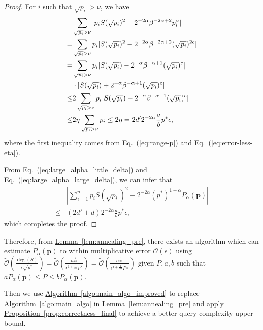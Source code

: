 \documentclass[journal]{IEEEtran}
\newcommand{\eq}[1]{Eq.~(\ref{eq:#1})}
\newcommand{\lem}[1]{\hyperref[lem:#1]{Lemma~\ref*{lem:#1}}}
\newcommand{\prop}[1]{\hyperref[prop:#1]{Proposition~\ref*{prop:#1}}}
\newcommand{\algo}[1]{\hyperref[algo:#1]{Algorithm~\ref*{algo:#1}}}
\begin{document}
\begin{proof}
  For $i$ such that $\sqrt{p_i} > \nu$, we have
  \begin{align}
      & \sum_{\sqrt{p_i} > \nu} |p_iS(\sqrt{p_i})^2-2^{-2\alpha}\beta^{-2\alpha+2}p_i^{\alpha}|
      \nonumber \\= & \sum_{\sqrt{p_i}> \nu} p_i|S(\sqrt{p_i})^2-2^{-2\alpha}\beta^{-2\alpha+2}(\sqrt{p_i})^{2c}| \notag
      \\ = & \sum_{\sqrt{p_i}> \nu} p_i|S(\sqrt{p_i})-2^{-\alpha}\beta^{-\alpha+1}(\sqrt{p_i})^{c}|\nonumber \\ &\cdot|S(\sqrt{p_i})+2^{-\alpha}\beta^{-\alpha+1}(\sqrt{p_i})^{c}| \notag
      \\ \le & 2\sum_{\sqrt{p_i}> \nu} p_i|S(\sqrt{p_i})-2^{-\alpha}\beta^{-\alpha+1}(\sqrt{p_i})^{c}| \notag
      \\ \le & 2\eta \sum_{\sqrt{p_i} > \nu} p_i \le 2\eta = 2d'2^{-2\alpha}\frac{a}{b}p^*\epsilon, \label{eq:large_alpha_large_delta}
    \end{align}
  where the first inequality comes from \eq{range-p} and \eq{error-less-eta}.



  From \eq{large_alpha_little_delta} and \eq{large_alpha_large_delta}, we can infer that
  \begin{align}
    \label{eq:large_alpha_eqn1}
    &\left|\sum_{i=1}^n p_iS(\sqrt{p_i})^2 -2^{-2\alpha}(p^*)^{1-\alpha}P_{\alpha}(\mathbf{p})\right| \nonumber \\ \le & (2d'+d)2^{-2\alpha}\frac{a}{b}p^*\epsilon,
  \end{align}
  which completes the proof.
\end{proof}

Therefore, from \lem{annealing_pre}, there exists an algorithm which can estimate $P_{\alpha}(\mathbf{p})$ to within multiplicative error $\mathcal{O}(\epsilon)$ using $\widetilde{\mathcal{O}}\left(\frac{\deg(S)}{\epsilon \sqrt{p^*}}\right) = \widetilde{\mathcal{O}}\left(\frac{n^{\frac{1}{2\alpha}}}{\epsilon^{1+\frac{1}{2\alpha}} p^*}\right) = \widetilde{\mathcal{O}}\left(\frac{n^{\frac{1}{2\alpha}}}{\epsilon^{1+\frac{1}{2\alpha}}P^{\frac{1}{\alpha}}}\right)$ given $P,a,b$ such that $aP_{\alpha}(\mathbf{p}) \le P \le bP_{\alpha}(\mathbf{p})$.

Then we use \algo{main_algo_improved} to replace \algo{main_algo} in \lem{annealing_pre} and apply \prop{correctness_final} to achieve a better query complexity upper bound.
\end{document}
